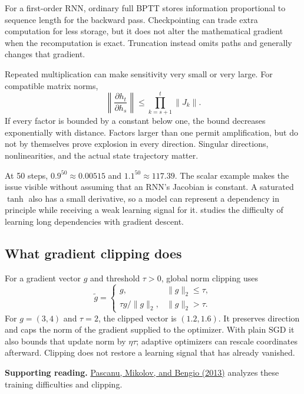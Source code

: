 For a first-order RNN, ordinary full BPTT stores information proportional
to sequence length for the backward pass. Checkpointing can trade extra
computation for less storage, but it does not alter the mathematical
gradient when the recomputation is exact. Truncation instead omits paths
and generally changes that gradient.


Repeated multiplication can make sensitivity very small or very large.
For compatible matrix norms,
\[
 \left\|\frac{\partial h_t}{\partial h_s}\right\|
 \le\prod_{k=s+1}^{t}\|J_k\|.
\]
If every factor is bounded by a constant below one, the bound decreases
exponentially with distance. Factors larger than one permit amplification,
but do not by themselves prove explosion in every direction. Singular
directions, nonlinearities, and the actual state trajectory matter.


At 50 steps, $0.9^{50}\approx0.00515$ and $1.1^{50}\approx117.39$.
The scalar example makes the issue visible without assuming that an RNN's
Jacobian is constant. A saturated $\tanh$ also has a small derivative,
so a model can represent a dependency in principle while receiving a weak
learning signal for it.  studies the difficulty of learning
long dependencies with gradient descent.

\subsection*{What gradient clipping does}
For a gradient vector $g$ and threshold $\tau>0$, global norm clipping uses
\[
 \widetilde g=
 \begin{cases}
 g,&\|g\|_2\le\tau,\\
 \tau g/\|g\|_2,&\|g\|_2>\tau.
 \end{cases}
\]
For $g=(3,4)$ and $\tau=2$, the clipped vector is $(1.2,1.6)$.
It preserves direction and caps the norm of the gradient supplied to the
optimizer. With plain SGD it also bounds that update norm by $\eta\tau$;
adaptive optimizers can rescale coordinates afterward. Clipping does not
restore a learning signal that has already vanished.

\textbf{Supporting reading.} \href{https://proceedings.mlr.press/v28/pascanu13.html}{Pascanu,
Mikolov, and Bengio (2013)} analyzes these training difficulties and clipping.
